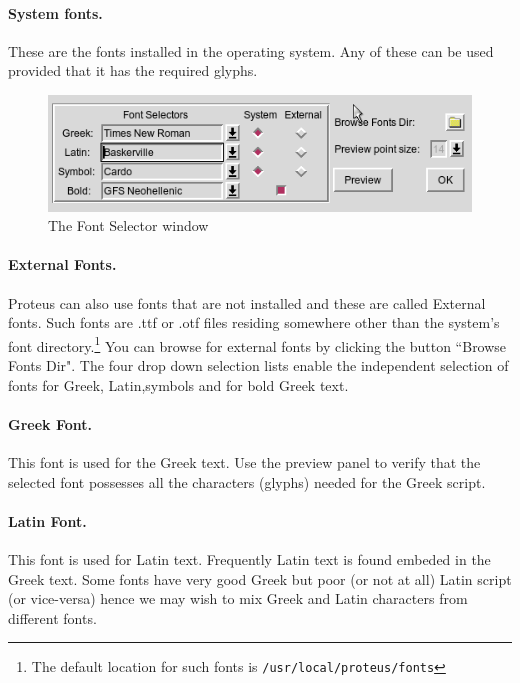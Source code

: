 \documentclass[11pt,a4paper]{article}
\begin{document}
    \paragraph{System fonts.} These are the fonts installed in the operating system.
      Any of these can be used provided that it has the required glyphs.
    \begin{figure}[htb]
      \begin{center}
        \includegraphics[scale=0.6]{../images/font-selector.png}
        \caption{The Font Selector window}
      \end{center}
    \end{figure}
    \paragraph{External Fonts.} Proteus can also use fonts that are not installed and these
    are called External fonts. Such fonts are .ttf or .otf files residing
    somewhere other than the system's font directory.\footnote{
                          The default location for such fonts is
                        {\tt /usr/local/proteus/fonts}}
    You can browse for external fonts by clicking the button ``Browse Fonts Dir".
    The four drop down selection lists enable the independent selection of fonts for
    Greek, Latin,symbols and for bold Greek text.
    \paragraph{Greek Font.}This font is used for the Greek text. Use the preview panel
     to verify that the selected font possesses all the characters (glyphs) needed
     for the Greek script.
    \paragraph{Latin Font.}This font is used for Latin text.
      Frequently Latin text
      is found embeded in the Greek text.  Some fonts have very good
      Greek but poor (or not at all) Latin script (or vice-versa)
      hence we may wish to mix Greek and Latin characters from different fonts.
\end{document}
